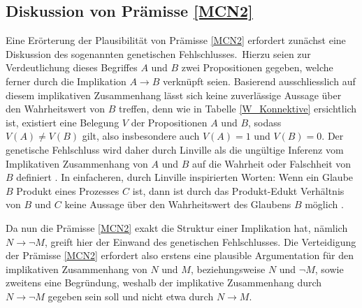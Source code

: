 \documentclass[a4paper,11pt]{article}
\numberwithin{equation}{section}
\begin{document}
\subsection{Diskussion von Prämisse \ref{MCN2}}\label{fehldep} 
Eine Erörterung der Plausibilität von Prämisse \ref{MCN2} erfordert zunächst eine Diskussion des sogenannten \flqq genetischen Fehlschlusses\frqq.\ Hierzu seien zur Verdeutlichung dieses Begriffes $A$ und $B$ zwei Propositionen gegeben, welche ferner durch die Implikation $A \rightarrow B$ verknüpft seien. Basierend ausschliesslich auf diesem implikativen Zusammenhang lässt sich keine zuverlässige Aussage über den Wahrheitswert von $B$ treffen, denn wie in Tabelle \ref{W_Konnektive} ersichtlich ist, existiert eine Belegung $V$ der Propositionen $A$ und $B$, sodass $V(A) \neq V(B)$ gilt, also insbesondere auch $V(A) = 1$ und $V(B) = 0$. Der genetische Fehlschluss wird daher durch Linville als die ungültige Inferenz vom Implikativen Zusammenhang von $A$ und $B$ auf die Wahrheit oder Falschheit von $B$ definiert \cite[S. 395]{Linville2009-LINTMA-2}. In einfacheren, durch Linville inspirierten Worten: Wenn ein Glaube $B$ Produkt eines Prozesses $C$ ist, dann ist durch das Produkt-Edukt Verhältnis von $B$ und $C$ keine Aussage über den Wahrheitswert des Glaubens $B$ möglich \cite[S. 395]{Linville2009-LINTMA-2}.

Da nun die Prämisse \ref{MCN2} exakt die Struktur einer Implikation hat, nämlich $N \rightarrow \neg M$, greift hier der Einwand des genetischen Fehlschlusses.  Die Verteidigung der Prämisse \ref{MCN2} erfordert also erstens eine plausible Argumentation für den implikativen Zusammenhang von $N$ und $M$, beziehungsweise $N$ und $\neg M$, sowie zweitens eine Begründung, weshalb der implikative Zusammenhang durch $N \rightarrow \neg M$ gegeben sein soll und nicht etwa durch $N \rightarrow M$.
\end{document}
